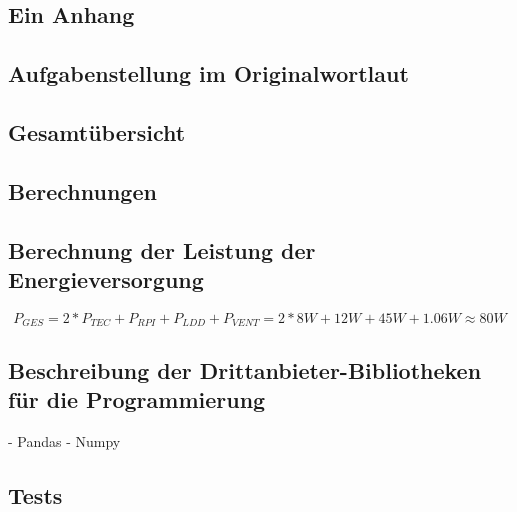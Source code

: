 \begin{appendix} %
\section{Ein Anhang}


\subsection{Aufgabenstellung im Originalwortlaut}


\subsection{Gesamtübersicht}


\subsection{Berechnungen}

\subsection{Berechnung der Leistung der Energieversorgung}
\begin{equation}
P_{GES} = 2*P_{TEC}+P_{RPI}+P_{LDD}+P_{VENT} = 2*8W+12W+45W+1.06W \approx 80W
    \label{formula:_calculation_sp_power}
\end{equation}

\subsection{Beschreibung der Drittanbieter-Bibliotheken für die Programmierung}
- Pandas
- Numpy

\label{section:_libraries_py}
\subsection{Tests}


\end{appendix}
